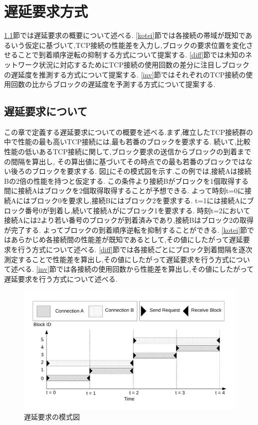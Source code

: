 \documentclass[a4j,12pt]{gradthesis_utf8}
\begin{document}
\section{遅延要求方式}
\label{chienyokyuhoshiki}
\ref{chienyokyu}節では遅延要求の概要について述べる.
\ref{kotei}節では各接続の帯域が既知であるいう仮定に基づいて,TCP接続の性能差を入力し,ブロックの要求位置を変化させることで到着順序逆転の抑制する方式について提案する.
\ref{diff}節では未知のネットワーク状況に対応するためにTCP接続の使用回数の差分に注目しブロックの遅延度を推測する方式について提案する.
\ref{inv}節ではそれぞれのTCP接続の使用回数の比からブロックの遅延度を予測する方式について提案する.

\subsection{遅延要求について}
\label{chienyokyu}
この章で定義する遅延要求についての概要を述べる.まず,確立したTCP接続群の中で性能の最も高いTCP接続には,最も若番のブロックを要求する.
続いて,比較性能の低いあるTCP接続に関して,ブロック要求の送信からブロックの到着までの間隔を算出し,
その算出値に基づいてその時点での最も若番のブロックではない後ろのブロックを要求する.
図\ref{delay}にその模式図を示す.この例では,接続Aは接続Bの2倍の性能を持つと仮定する.
この条件より接続Bがブロックを1個取得する間に接続Aはブロックを2個取得取得することが予想できる.
よって時刻t=0に接続Aにはブロック0を要求し,接続Bにはブロック2を要求する.
t=1には接続Aにブロック番号0が到着し,続いて接続Aがにブロック1を要求する.
時刻t=2において接続Aには2より若い番号のブロックが到着済みであり,接続Bはブロック2の取得が完了する.
よってブロックの到着順序逆転を抑制することができる.
\ref{kotei}節ではあらかじめ各接続間の性能差が既知であるとして,その値にしたがって遅延要求を行う方式について述べる.
\ref{diff}節では各接続ごとにブロック到着間隔を逐次測定することで性能差を算出し,その値にしたがって遅延要求を行う方式について述べる.
\ref{inv}節では各接続の使用回数から性能差を算出し,その値にしたがって遅延要求を行う方式について述べる.

 \begin{figure}[h]
    \centering
    \includegraphics[width=16.25cm]{delay.pdf}
    \caption{遅延要求の模式図}
    \label{delay}
\end{figure}
\end{document}
